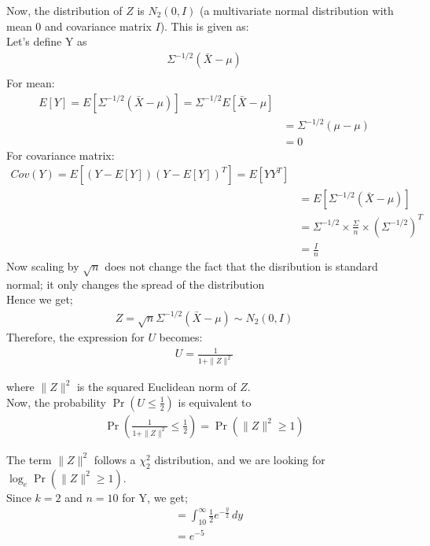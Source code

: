 \documentclass[journal,12pt,onecolumn]{IEEEtran}
\theoremstyle{remark}
\begin{document}
Now, the distribution of $Z$ is $N_2(0, I)$ (a multivariate normal distribution with mean $0$ and covariance matrix $I$). This is given as:\\
Let's define Y as
\begin{align}
    \Sigma^{-1/2}(\bar{X} - \mu)\\
\end{align}
For mean:
\begin{align}
    E[Y] = E[\Sigma^{-1/2}(\bar{X} - \mu)] = \Sigma^{-1/2}E[\bar{X} - \mu]\\
    &= \Sigma^{-1/2}(\mu - \mu)\\
    &= 0
\end{align}
For covariance matrix:
\begin{align}
    Cov(Y) = E[(Y-E[Y])(Y-E[Y])^T]=E[YY^T]\\
    &= E[\Sigma^{-1/2}(\bar{X} - \mu)]\\
    &= \Sigma^{-1/2}\times\frac{\Sigma}{n}\times(\Sigma^{-1/2})^T\\
    &= \frac{I}{n}
\end{align}
Now scaling by $\sqrt{n}$ does not change the fact that the disribution is standard normal; it only changes the spread of the distribution\\ 
Hence we get;
\begin{align}
    Z = \sqrt{n}\Sigma^{-1/2}(\bar{X} - \mu) \sim N_2(0,I)
\end{align}
Therefore, the expression for $U$ becomes:
\begin{align}
    U = \frac{1}{1 + \|Z\|^2}
\end{align}

where $\|Z\|^2$ is the squared Euclidean norm of $Z$.\\

Now, the probability $\Pr(U \leq \frac{1}{2})$ is equivalent to 
\begin{align}
    \Pr\left(\frac{1}{1 + \|Z\|^2} \leq \frac{1}{2}\right)
    = \Pr(\|Z\|^2 \geq 1)
\end{align}

The term $\|Z\|^2$ follows a $\chi^{2}_{2}$ distribution, and we are looking for $\log_e \Pr(\|Z\|^2 \geq 1)$.\\

Since $k=2$ and $n=10$ for Y, we get;
\begin{align}
    &= \int_{10}^{\infty} \frac{1}{2}e^{-\frac{y}{2}} \,dy\\
    &= e^{-5}   
\end{align}   
\end{document}
